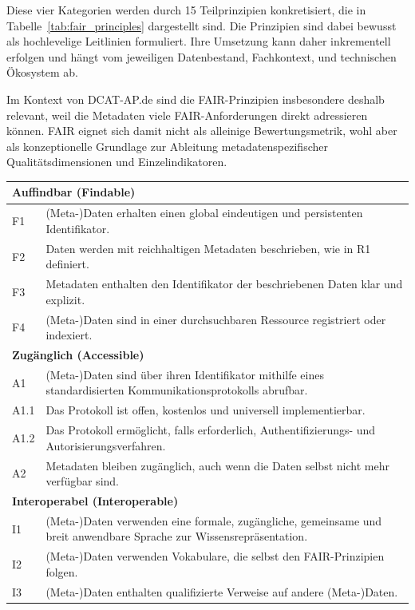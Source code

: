Diese vier Kategorien werden durch 15 Teilprinzipien konkretisiert, die in Tabelle~\ref{tab:fair_principles} dargestellt sind. Die Prinzipien sind dabei bewusst als hochlevelige Leitlinien formuliert. Ihre Umsetzung kann daher inkrementell erfolgen und hängt vom jeweiligen Datenbestand, Fachkontext, und technischen Ökosystem ab.\cite{wilkinson2016fair}

Im Kontext von DCAT-AP.de sind die FAIR-Prinzipien insbesondere deshalb relevant, weil die Metadaten viele FAIR-Anforderungen direkt adressieren können. FAIR eignet sich damit nicht als alleinige Bewertungsmetrik, wohl aber als konzeptionelle Grundlage zur Ableitung metadatenspezifischer Qualitätsdimensionen und Einzelindikatoren.

\begin{table}[h!]
    \centering
    \tiny
    \addtolength{\leftskip}{-6cm}
    \addtolength{\rightskip}{-6cm}
    \begin{tabular}{|l|p{13cm}|}
        \hline

        \multicolumn{2}{|l|}{\textbf{Auffindbar (Findable)}} \\ \hline
        F1 & (Meta-)Daten erhalten einen global eindeutigen und persistenten Identifikator. \\ \hline
        F2 & Daten werden mit reichhaltigen Metadaten beschrieben, wie in R1 definiert. \\ \hline
        F3 & Metadaten enthalten den Identifikator der beschriebenen Daten klar und explizit. \\ \hline
        F4 & (Meta-)Daten sind in einer durchsuchbaren Ressource registriert oder indexiert. \\ \hline

        \multicolumn{2}{|l|}{\textbf{Zugänglich (Accessible)}} \\ \hline
        A1 & (Meta-)Daten sind über ihren Identifikator mithilfe eines standardisierten Kommunikationsprotokolls abrufbar. \\ \hline
        A1.1 & Das Protokoll ist offen, kostenlos und universell implementierbar. \\ \hline
        A1.2 & Das Protokoll ermöglicht, falls erforderlich, Authentifizierungs- und Autorisierungsverfahren. \\ \hline
        A2 & Metadaten bleiben zugänglich, auch wenn die Daten selbst nicht mehr verfügbar sind. \\ \hline

        \multicolumn{2}{|l|}{\textbf{Interoperabel (Interoperable)}} \\ \hline
        I1 & (Meta-)Daten verwenden eine formale, zugängliche, gemeinsame und breit anwendbare Sprache zur Wissensrepräsentation. \\ \hline
        I2 & (Meta-)Daten verwenden Vokabulare, die selbst den FAIR-Prinzipien folgen. \\ \hline
        I3 & (Meta-)Daten enthalten qualifizierte Verweise auf andere (Meta-)Daten. \\ \hline


\end{tabular}
\end{table}
